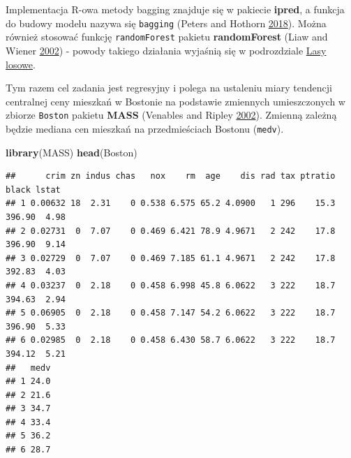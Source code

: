 \documentclass[
]{book}
\newenvironment{Shaded}{\begin{snugshade}}{\end{snugshade}}
\newcommand{\DataTypeTok}[1]{\textcolor[rgb]{0.13,0.29,0.53}{#1}}
\newcommand{\DecValTok}[1]{\textcolor[rgb]{0.00,0.00,0.81}{#1}}
\newcommand{\KeywordTok}[1]{\textcolor[rgb]{0.13,0.29,0.53}{\textbf{#1}}}
\newcommand{\NormalTok}[1]{#1}
\newcommand{\OperatorTok}[1]{\textcolor[rgb]{0.81,0.36,0.00}{\textbf{#1}}}
\newcommand{\StringTok}[1]{\textcolor[rgb]{0.31,0.60,0.02}{#1}}
\theoremstyle{plain}
\theoremstyle{definition}
\theoremstyle{definition}
\theoremstyle{definition}
\theoremstyle{definition}
\theoremstyle{remark}
\let\BeginKnitrBlock\begin \let\EndKnitrBlock\end
\begin{document}
Implementacja R-owa metody bagging znajduje się w pakiecie \textbf{ipred}, a funkcja do budowy modelu nazywa się \texttt{bagging} (Peters and Hothorn \protect\hyperlink{ref-R-ipred}{2018}). Można również stosować funkcję \texttt{randomForest} pakietu \textbf{randomForest} (Liaw and Wiener \protect\hyperlink{ref-R-las}{2002}) - powody takiego działania wyjaśnią się w podrozdziale \protect\hyperlink{lasy-losowe}{Lasy losowe}.

\BeginKnitrBlock{example}
\protect\hypertarget{exm:przyk51}{}{\label{exm:przyk51} }Tym razem cel zadania jest regresyjny i polega na ustaleniu miary tendencji centralnej ceny mieszkań w Bostonie na podstawie zmiennych umieszczonych w zbiorze \texttt{Boston} pakietu \textbf{MASS} (Venables and Ripley \protect\hyperlink{ref-R-MASS}{2002}). Zmienną zależną będzie mediana cen mieszkań na przedmieściach Bostonu (\texttt{medv}).
\EndKnitrBlock{example}

\begin{Shaded}
\begin{Highlighting}[]
\KeywordTok{library}\NormalTok{(MASS)}
\KeywordTok{head}\NormalTok{(Boston)}
\end{Highlighting}
\end{Shaded}

\begin{verbatim}
##      crim zn indus chas   nox    rm  age    dis rad tax ptratio  black lstat
## 1 0.00632 18  2.31    0 0.538 6.575 65.2 4.0900   1 296    15.3 396.90  4.98
## 2 0.02731  0  7.07    0 0.469 6.421 78.9 4.9671   2 242    17.8 396.90  9.14
## 3 0.02729  0  7.07    0 0.469 7.185 61.1 4.9671   2 242    17.8 392.83  4.03
## 4 0.03237  0  2.18    0 0.458 6.998 45.8 6.0622   3 222    18.7 394.63  2.94
## 5 0.06905  0  2.18    0 0.458 7.147 54.2 6.0622   3 222    18.7 396.90  5.33
## 6 0.02985  0  2.18    0 0.458 6.430 58.7 6.0622   3 222    18.7 394.12  5.21
##   medv
## 1 24.0
## 2 21.6
## 3 34.7
## 4 33.4
## 5 36.2
## 6 28.7
\end{verbatim}

\begin{Shaded}
\end{Shaded}
\end{document}
